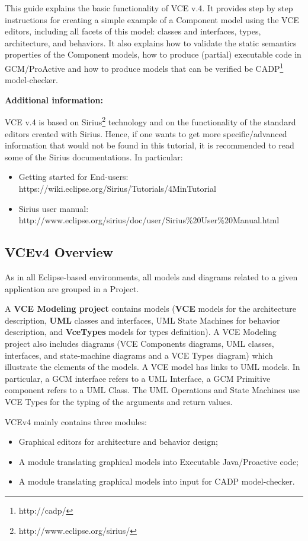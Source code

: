 \documentclass[12pt]{article}
\begin{document}
This guide explains the basic functionality of VCE v.4. 
It provides step by step instructions for creating a simple example of a Component model using the VCE editors, including all facets of this model: classes and interfaces, types, architecture, and behaviors. It also explains how to validate the static semantics properties of the Component models, how to produce (partial) executable code in GCM/ProActive and how to produce models that can be verified be CADP\footnote{http://cadp/} model-checker.

\textbf{Additional information:}

VCE v.4 is based on Sirius\footnote{http://www.eclipse.org/sirius/} technology and on the functionality of the standard editors created with Sirius. Hence, if one wants to get more specific/advanced information that would not be found in this tutorial, it is recommended to read some of the Sirius documentations. In particular:
\begin{itemize}
\item
Getting started for End-users: https://wiki.eclipse.org/Sirius/Tutorials/4MinTutorial
\item
Sirius user manual: http://www.eclipse.org/sirius/doc/user/Sirius\%20User\%20Manual.html
\end{itemize}

\subsection{VCEv4 Overview}
As in all Eclipse-based environments, all models and diagrams related to a given application are grouped in a Project. 

A \textbf{VCE Modeling project} contains models (\textbf{VCE} models for the architecture description, \textbf{UML} classes and interfaces, UML State Machines for behavior description, and \textbf{VceTypes} models for types definition). A VCE Modeling project also includes  diagrams (VCE Components diagrams, UML classes, interfaces, and state-machine diagrams and a VCE Types diagram) which illustrate the elements of the models. A VCE model has links to UML models. In particular, a GCM interface refers to a UML Interface, a GCM Primitive component refers to a UML Class. The UML Operations and State Machines use VCE Types for the typing of the arguments and return values. 

VCEv4 mainly contains three modules:
\begin{itemize}
\item
Graphical editors for architecture and behavior design;
\item
A module translating graphical models into Executable Java/Proactive code;
\item
A module translating graphical models into input for CADP model-checker.
\end{itemize}
\end{document}
